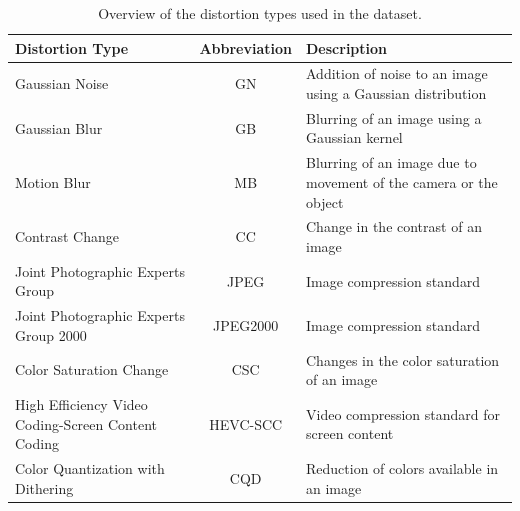\begin{table}
\centering
\caption{Overview of the distortion types used in the dataset.}
\begin{tabular}{|p{6cm}|c|p{6cm}|}
\hline
\textbf{Distortion Type} & \textbf{Abbreviation} & \textbf{Description} \\
\hline
\hline
Gaussian Noise & GN & Addition of noise to an image using a Gaussian distribution \\
\hline
Gaussian Blur & GB & Blurring of an image using a Gaussian kernel \\
\hline
Motion Blur & MB & Blurring of an image due to movement of the camera or the object \\
\hline
Contrast Change & CC & Change in the contrast of an image \\
\hline
Joint Photographic Experts Group & JPEG & Image compression standard \\
\hline
Joint Photographic Experts Group 2000 & JPEG2000 & Image compression standard \\
\hline
Color Saturation Change & CSC & Changes in the color saturation of an image \\
\hline
High Efficiency Video Coding-Screen Content Coding & HEVC-SCC & Video compression standard for screen content \\
\hline
Color Quantization with Dithering & CQD & Reduction of colors available in an image \\
\hline
\end{tabular}
\label{tab:distortion_types}
\end{table}


